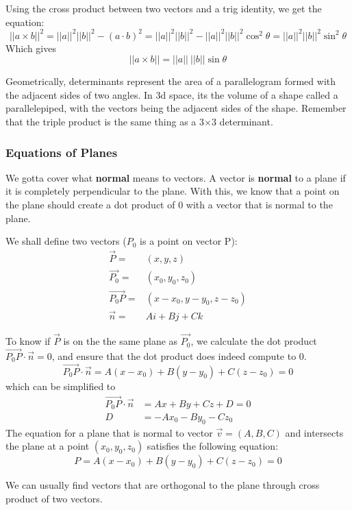 \documentclass{article}
\begin{document}
          Using the cross product between two vectors and a trig identity, we get the equation:
          \[ ||a\times b||^2 = ||a||^2||b||^2 - (a \cdot b)^2 =
          ||a||^2||b||^2 - ||a||^2||b||^2 \cos^2\theta = 
          ||a||^2||b||^2\sin^2\theta \]
          Which gives 
          \[ ||a\times b|| = ||a||\ ||b||\sin\theta \]
          
Geometrically, determinants represent the area of a parallelogram formed with
the adjacent sides of two angles. In 3d space, its the volume of a shape called a parallelepiped,
with the vectors being the adjacent sides of the shape. Remember that the triple product is the same
thing as a 3$\times$3 determinant.
\subsubsection{Equations of Planes}
We gotta cover what \textbf{normal} means to vectors. A vector is \textbf{normal} to a plane if it is completely perpendicular to the plane. With this, we know that a point on the plane should create a dot product of 0 with a vector that is normal to the plane.\newline

We shall define two vectors ($P_0$ is a point on vector P):
\begin{align}
  \vec{P} =& (x, y, z) \\
  \vec{P_{0}} =& (x_0, y_0, z_0)\\
  \overrightarrow{P_0P} =& (x - x_0, y - y_0, z - z_0)\\
  \vec{n} =& Ai + Bj + Ck
\end{align}

To know if $\vec{P}$ is on the the same plane as $\vec{P_{0}}$, we calculate the dot product
$\overrightarrow{P_0P} \cdot \vec{n} = 0$, and ensure that the dot product does indeed compute to 0.
\[
  \overrightarrow{P_0P} \cdot \vec{n} = A(x - x_0) + B(y - y_0) + C(z - z_0) = 0
\]
which can be simplified to
\begin{align}
  \overrightarrow{P_0P} \cdot \vec{n} &= Ax + By + Cz + D = 0 \\
   D &= -Ax_0 - By_0 - Cz_0
\end{align}
The equation for a plane that is normal to vector $\vec{v} = (A,B,C)$ and intersects the plane
at a point $(x_0,y_0,z_0)$ satisfies the following equation:
\[
  P = A(x - x_0) + B(y - y_0) + C(z - z_0) = 0
\]

We can usually find vectors that are orthogonal to the plane through cross product of two vectors.
\end{document}
